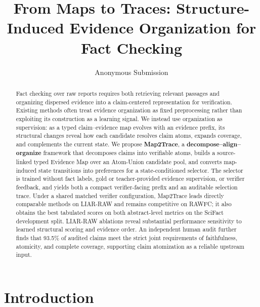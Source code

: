 \documentclass[letterpaper]{article}
\title{From Maps to Traces: Structure-Induced Evidence Organization for Fact Checking}
\author{Anonymous Submission}
\begin{document}
\maketitle

\begin{abstract}
Fact checking over raw reports requires both retrieving relevant passages and organizing dispersed evidence into a claim-centered representation for verification. Existing methods often treat evidence organization as fixed preprocessing rather than exploiting its construction as a learning signal. We instead use organization as supervision: as a typed claim--evidence map evolves with an evidence prefix, its structural changes reveal how each candidate resolves claim atoms, expands coverage, and complements the current state. We propose \textbf{Map2Trace}, a \textbf{decompose--align--organize} framework that decomposes claims into verifiable atoms, builds a source-linked typed Evidence Map over an Atom-Union candidate pool, and converts map-induced state transitions into preferences for a state-conditioned selector. The selector is trained without fact labels, gold or teacher-provided evidence supervision, or verifier feedback, and yields both a compact verifier-facing prefix and an auditable selection trace. Under a shared matched verifier configuration, Map2Trace leads directly comparable methods on LIAR-RAW and remains competitive on RAWFC; it also obtains the best tabulated scores on both abstract-level metrics on the SciFact development split. LIAR-RAW ablations reveal substantial performance sensitivity to learned structural scoring and evidence order. An independent human audit further finds that 93.5\% of audited claims meet the strict joint requirements of faithfulness, atomicity, and complete coverage, supporting claim atomization as a reliable upstream input.
\end{abstract}

\begin{links}
\end{links}

\section{Introduction}
\end{document}
